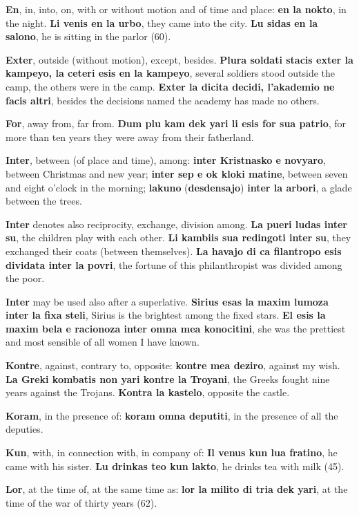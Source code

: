 \textbf{En}, in, into, on, with or without motion and of time and place: \textbf{en la nokto}, in the night. \textbf{Li venis en la urbo}, they came into the city. \textbf{Lu sidas en la salono}, he is sitting in the parlor (60).

\textbf{Exter}, outside (without motion), except, besides. \textbf{Plura soldati stacis exter la kampeyo, la ceteri esis en la kampeyo}, several soldiers stood outside the camp, the others were in the camp. \textbf{Exter la dicita decidi, l'akademio ne facis altri}, besides the decisions named the academy has made no others.

\textbf{For}, away from, far from. \textbf{Dum plu kam dek yari li esis for sua patrio}, for more than ten years they were away from their fatherland.

\textbf{Inter}, between (of place and time), among: \textbf{inter Kristnasko e novyaro}, between Christmas and new year; \textbf{inter sep e ok kloki matine}, between seven and eight o'clock in the morning; \textbf{lakuno }(\textbf{desdensajo})\textbf{ inter la arbori}, a glade between the trees.

\textbf{Inter} denotes also reciprocity, exchange, division among. \textbf{La pueri ludas inter su}, the children play with each other. \textbf{Li kambiis sua redingoti inter su}, they exchanged their coats (between themselves). \textbf{La havajo di ca filantropo esis dividata inter la povri}, the fortune of this philanthropist was divided among the poor.

\textbf{Inter} may be used also after a superlative. \textbf{Sirius esas la maxim lumoza inter la fixa steli}, Sirius is the brightest among the fixed stars. \textbf{El esis la maxim bela e racionoza inter omna mea konocitini}, she was the prettiest and most sensible of all women I have known.

\textbf{Kontre}, against, contrary to, opposite: \textbf{kontre mea deziro}, against my wish. \textbf{La Greki kombatis non yari kontre la Troyani}, the Greeks fought nine years against the Trojans. \textbf{Kontra la kastelo}, opposite the castle.

\textbf{Koram}, in the presence of: \textbf{koram omna deputiti}, in the presence of all the deputies.

\textbf{Kun}, with, in connection with, in company of: \textbf{Il venus kun lua fratino}, he came with his sister. \textbf{Lu drinkas teo kun lakto}, he drinks tea with milk (45).

\textbf{Lor}, at the time of, at the same time as: \textbf{lor la milito di tria dek yari}, at the time of the war of thirty years (62).

